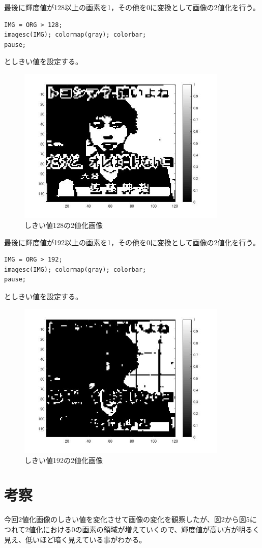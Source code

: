 \documentclass{jsarticle}
\begin{document}
最後に輝度値が128以上の画素を1，その他を0に変換として画像の2値化を行う。
\begin{lstlisting}[basicstyle=\ttfamily\footnotesize, frame=single]
IMG = ORG > 128;
imagesc(IMG); colormap(gray); colorbar;
pause;
\end{lstlisting}
としきい値を設定する。
\begin{figure}[htbp]
 \begin{center}
  \includegraphics[width=10cm]{kadai3-3.jpg}
 \end{center}
 \caption{しきい値128の2値化画像}
\end{figure}

\newpage

最後に輝度値が192以上の画素を1，その他を0に変換として画像の2値化を行う。
\begin{lstlisting}[basicstyle=\ttfamily\footnotesize, frame=single]
IMG = ORG > 192;
imagesc(IMG); colormap(gray); colorbar;
pause;
\end{lstlisting}
としきい値を設定する。
\begin{figure}[htbp]
 \begin{center}
  \includegraphics[width=10cm]{kadai3-4.jpg}
 \end{center}
 \caption{しきい値192の2値化画像}
\end{figure}

\section{考察}
今回2値化画像のしきい値を変化させて画像の変化を観察したが、図2から図5につれて2値化における0の画素の領域が増えていくので、輝度値が高い方が明るく見え、低いほど暗く見えている事がわかる。
\end{document}
